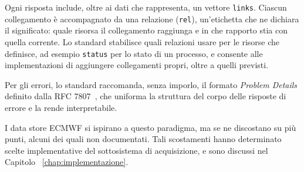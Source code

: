 Ogni risposta include, oltre ai dati che rappresenta, un vettore \texttt{links}. Ciascun
collegamento è accompagnato da una relazione (\texttt{rel}), un'etichetta che ne dichiara
il significato: quale risorsa il collegamento raggiunga e in che rapporto stia con quella
corrente. Lo standard stabilisce quali relazioni usare per le risorse che definisce, ad
esempio \texttt{status} per lo stato di un processo, e consente alle implementazioni di
aggiungere collegamenti propri, oltre a quelli previsti.

Per gli errori, lo standard raccomanda, senza imporlo, il formato \emph{Problem Details}
definito dalla RFC 7807~\cite{rfc7807}, che uniforma la struttura del corpo delle risposte
di errore e la rende interpretabile.

I data store \ac{ECMWF} si ispirano a questo paradigma, ma se ne discostano su più punti,
alcuni dei quali non documentati. Tali scostamenti hanno determinato scelte
implementative del sottosistema di acquisizione, e sono discussi nel Capitolo ~\ref{chap:implementazione}.